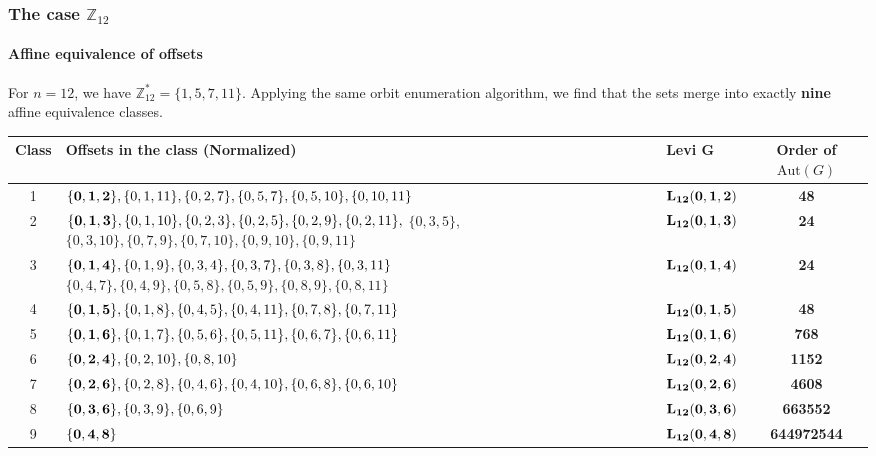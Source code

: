 \documentclass[12pt,letterpaper]{amsart}
\begin{document}
\subsubsection{The case $\mathbb{Z}_{12}$}

\paragraph{Affine equivalence of offsets}%

For $n=12$, we have $\mathbb{Z}_{12}^* = \{1, 5, 7, 11\}$. Applying the same orbit enumeration algorithm, we find that the sets merge into exactly \textbf{nine} affine equivalence classes.
\begin{center}
\begin{tabular}{|c|m{10.2cm}|m{2.0cm}|c|}
\hline
Class & Offsets in the class (Normalized)&\centering Levi G& Order of $\mathrm{Aut}(G)$ \\ \hline
1 &${\bf \{0,1,2\}}, \{0,1,11\}, \{0,2,7\}, \{0,5,7\}, \{0,5,10\}, \{0,10,11\}$ &\centering ${\bf L_{12}(0,1,2)}$& {\bf 48}\\ \hline
2 &  ${\bf\{0,1,3\}}, \{0,1,10\}, \{0,2,3\}, \{0,2,5\}, \{0,2,9\}, \{0,2,11\},$ \newline $ \{0,3,5\}$, $\{0,3,10\}, \{0,7,9\}, \{0,7,10\}, \{0,9,10\}, \{0,9,11\}$ &\centering ${\bf L_{12}(0,1,3)}$ & {\bf 24}\\ \hline
3 &${\bf\{0,1,4\}}, \{0,1,9\}, \{0,3,4\}, \{0,3,7\}, \{0,3,8\}, \{0,3,11\}$ \newline $\{0,4,7\}, \{0,4,9\}, \{0,5,8\}, \{0,5,9\}, \{0,8,9\}, \{0,8,11\}$ &\centering ${\bf L_{12}(0,1,4)}$ & {\bf 24}\\ \hline
4 & ${\bf \{0,1,5\}}, \{0,1,8\}, \{0,4,5\}, \{0,4,11\}, \{0,7,8\}, \{0,7,11\}$ &\centering ${\bf L_{12}(0,1,5)}$ & {\bf 48}\\ \hline
5 & ${\bf \{0,1,6\}}, \{0,1,7\}, \{0,5,6\}, \{0,5,11\}, \{0,6,7\}, \{0,6,11\}$ & \centering ${\bf L_{12}(0,1,6)}$& {\bf 768}\\ \hline
6 & ${\bf \{0,2,4\}}, \{0,2,10\}, \{0,8,10\}$ & \centering ${\bf L_{12}(0,2,4)}$& {\bf 1152}\\ \hline
7 & ${\bf \{0,2,6\}}, \{0,2,8\}, \{0,4,6\}, \{0,4,10\}, \{0,6,8\}, \{0,6,10\}$ &\centering ${\bf L_{12}(0,2,6)}$ & {\bf 4608}\\ \hline
8 & ${\bf \{0,3,6\}}, \{0,3,9\}, \{0,6,9\}$ & \centering ${\bf L_{12}(0,3,6)}$&{\bf 663552} \\ \hline
9 & ${\bf \{0,4,8\}}$ &\centering ${\bf L_{12}(0,4,8)}$ & {\bf 644972544}\\ \hline
\end{tabular}
\end{center}
\end{document}
